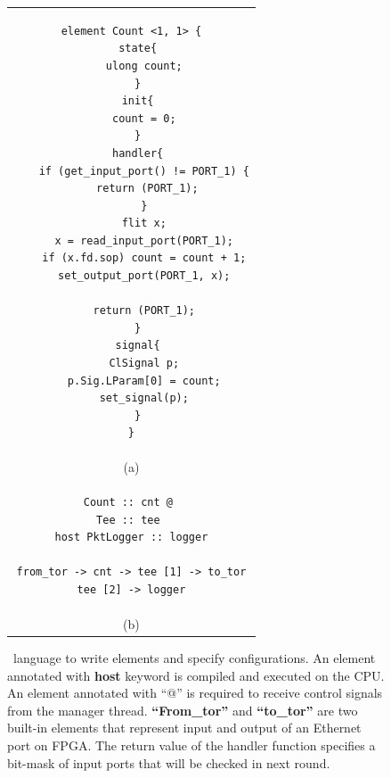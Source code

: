 \begin{figure}[t!]
\scriptsize \lstset{style=numbers}

\centering
\begin{tabular}{c}

\begin{lstlisting}
element Count <1, 1> {
  state{
    ulong count;
  }
  init{
    count = 0;
  }
  handler{
    if (get_input_port() != PORT_1) {
      return (PORT_1); 
    }
    flit x;
    x = read_input_port(PORT_1);
    if (x.fd.sop) count = count + 1;
    set_output_port(PORT_1, x);
   
    return (PORT_1);
  }
  signal{
    ClSignal p;
    p.Sig.LParam[0] = count;
    set_signal(p);
  }
}
\end{lstlisting} \vspace{3pt} \\
{\normalsize \centering (a)} \vspace{3pt} \\
\begin{lstlisting}
Count :: cnt @ 
Tee :: tee 
host PktLogger :: logger

from_tor -> cnt -> tee [1] -> to_tor
tee [2] -> logger
\end{lstlisting} \vspace{3pt} \\
{\normalsize \centering (b)} 
\end{tabular}
\caption{\name\ language to write elements and specify configurations. An element annotated with \textbf{host} keyword is compiled and executed on the CPU. An element annotated with ``@'' is required to receive control signals from the manager thread. 
\textbf{``From\_tor''} and \textbf{``to\_tor''} are two built-in elements that represent input and output of an Ethernet port on FPGA. The return value of the handler function specifies
a bit-mask of input ports that will be checked in next round.}
\label{clicknp:fig:lang}

\end{figure}

